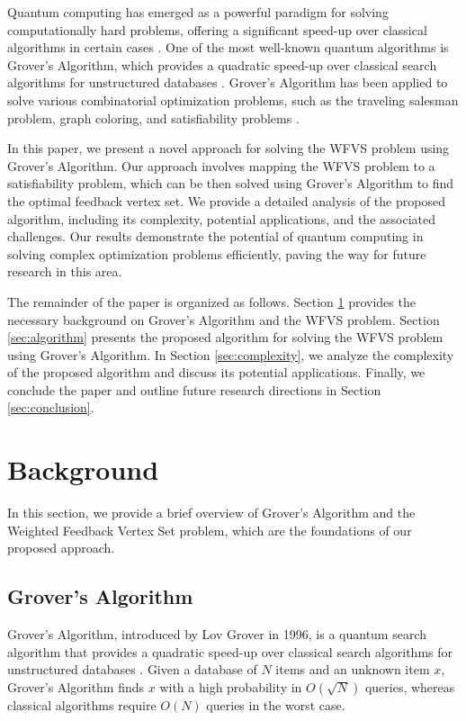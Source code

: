 Quantum computing has emerged as a powerful paradigm for solving computationally hard problems, offering a significant speed-up over classical algorithms in certain cases \cite{shor1994algorithms, grover1996fast}. One of the most well-known quantum algorithms is Grover's Algorithm, which provides a quadratic speed-up over classical search algorithms for unstructured databases \cite{grover1996fast}. Grover's Algorithm has been applied to solve various combinatorial optimization problems, such as the traveling salesman problem, graph coloring, and satisfiability problems \cite{zalka1999grover, durr1996quantum, ambainis2000quantum}.

In this paper, we present a novel approach for solving the WFVS problem using Grover's Algorithm. Our approach involves mapping the WFVS problem to a satisfiability problem, which can be then solved using Grover's Algorithm to find the optimal feedback vertex set. We provide a detailed analysis of the proposed algorithm, including its complexity, potential applications, and the associated challenges. Our results demonstrate the potential of quantum computing in solving complex optimization problems efficiently, paving the way for future research in this area.

The remainder of the paper is organized as follows. Section \ref{sec:background} provides the necessary background on Grover's Algorithm and the WFVS problem. Section \ref{sec:algorithm} presents the proposed algorithm for solving the WFVS problem using Grover's Algorithm. In Section \ref{sec:complexity}, we analyze the complexity of the proposed algorithm and discuss its potential applications. Finally, we conclude the paper and outline future research directions in Section \ref{sec:conclusion}.

\section{Background}
\label{sec:background}

In this section, we provide a brief overview of Grover's Algorithm and the Weighted Feedback Vertex Set problem, which are the foundations of our proposed approach.

\subsection{Grover's Algorithm}

Grover's Algorithm, introduced by Lov Grover in 1996, is a quantum search algorithm that provides a quadratic speed-up over classical search algorithms for unstructured databases \cite{grover1996fast}. Given a database of $N$ items and an unknown item $x$, Grover's Algorithm finds $x$ with a high probability in $O(\sqrt{N})$ queries, whereas classical algorithms require $O(N)$ queries in the worst case.

